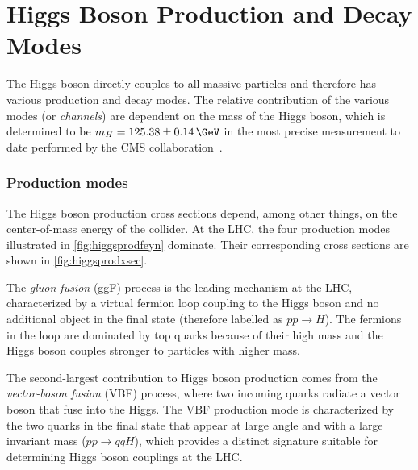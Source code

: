 

\section{Higgs Boson Production and Decay Modes}
\label{subsec:higgschannels}
The Higgs boson directly couples to all massive particles and therefore has various production and decay modes.
The relative contribution of the various modes (or \emph{channels}) are dependent on the mass of the Higgs boson, which is determined to be $m_H = 125.38 \pm 0.14\,\GeV$ in the most precise measurement to date performed by the CMS collaboration~\cite{CMS-HIG-19-004}.

\subsubsection{Production modes} 
The Higgs boson production cross sections depend, among other things, on the center-of-mass energy of the collider.
At the LHC, the four production modes illustrated in \cref{fig:higgsprodfeyn} dominate.
Their corresponding cross sections are shown in \cref{fig:higgsprodxsec}.

The \emph{gluon fusion} (ggF) process is the leading mechanism at the LHC, characterized by a virtual fermion loop coupling to the Higgs boson and no additional object in the final state (therefore labelled as $pp\rightarrow H$). 
The fermions in the loop are dominated by top quarks because of their high mass and the Higgs boson couples stronger to particles with higher mass. 

The second-largest contribution to Higgs boson production comes from the \emph{vector-boson fusion} (VBF) process, where two incoming quarks radiate a vector boson that fuse into the Higgs.
The VBF production mode is characterized by the two quarks in the final state that appear at large angle and with a large invariant mass ($pp\rightarrow qqH$), which provides a distinct signature suitable for determining Higgs boson couplings at the LHC.

